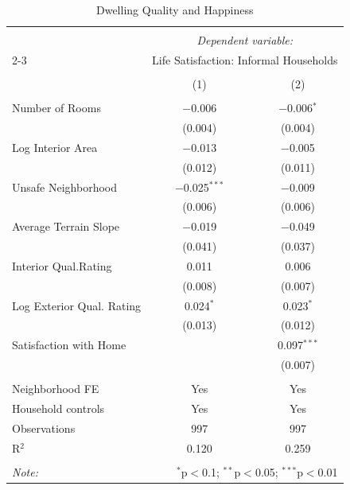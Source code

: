 
\begin{table}[H] \centering 
  \caption{Dwelling Quality and Happiness} 
  \label{reg_TABLE5} 
\scriptsize 
\begin{tabular}{@{\extracolsep{-7pt}}lcc} 
\\[-1.8ex]\hline 
\hline \\[-1.8ex] 
 & \multicolumn{2}{c}{\textit{Dependent variable:}} \\ 
\cline{2-3} 
 & \multicolumn{2}{c}{Life Satisfaction: Informal Households} \\ 
\\[-1.8ex] & (1) & (2)\\ 
\hline \\[-1.8ex] 
 Number of Rooms & $-$0.006 & $-$0.006$^{*}$ \\ 
  & (0.004) & (0.004) \\ 
  Log Interior Area & $-$0.013 & $-$0.005 \\ 
  & (0.012) & (0.011) \\ 
  Unsafe Neighborhood & $-$0.025$^{***}$ & $-$0.009 \\ 
  & (0.006) & (0.006) \\ 
  Average Terrain Slope & $-$0.019 & $-$0.049 \\ 
  & (0.041) & (0.037) \\ 
  Interior Qual.Rating & 0.011 & 0.006 \\ 
  & (0.008) & (0.007) \\ 
  Log Exterior Qual. Rating & 0.024$^{*}$ & 0.023$^{*}$ \\ 
  & (0.013) & (0.012) \\ 
  Satisfaction with Home &  & 0.097$^{***}$ \\ 
  &  & (0.007) \\ 
 \hline \\[-1.8ex] 
Neighborhood FE & Yes & Yes \\ 
Household controls & Yes & Yes \\ 
Observations & 997 & 997 \\ 
R$^{2}$ & 0.120 & 0.259 \\ 
\hline 
\hline \\[-1.8ex] 
\textit{Note:}  & \multicolumn{2}{r}{$^{*}$p$<$0.1; $^{**}$p$<$0.05; $^{***}$p$<$0.01} \\ 
\end{tabular} 
\end{table} 
